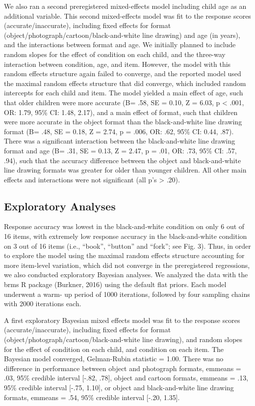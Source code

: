 \documentclass[10pt, letterpaper]{article}
\begin{document}
We also ran a second preregistered mixed-effects model including child
age as an additional variable. This second mixed-effects model was fit
to the response scores (accurate/inaccurate), including fixed effects
for format (object/photograph/cartoon/black-and-white line drawing) and
age (in years), and the interactions between format and age. We
initially planned to include random slopes for the effect of condition
on each child, and the three-way interaction between condition, age, and
item. However, the model with this random effects structure again failed
to converge, and the reported model used the maximal random effects
structure that did converge, which included random intercepts for each
child and item. The model yielded a main effect of age, such that older
children were more accurate (B= .58, SE = 0.10, Z = 6.03, p \textless{}
.001, OR: 1.79, 95\% CI: 1.48, 2.17), and a main effect of format, such
that children were more accurate in the object format than the
black-and-white line drawing format (B= .48, SE = 0.18, Z = 2.74, p =
.006, OR: .62, 95\% CI: 0.44, .87). There was a significant interaction
between the black-and-white line drawing format and age (B= .31, SE =
0.13, Z = 2.47, p = .01, OR: .73, 95\% CI: .57, .94), such that the
accuracy difference between the object and black-and-white line drawing
formats was greater for older than younger children. All other main
effects and interactions were not significant (all p's \textgreater{}
.20).

\subsection{Exploratory Analyses}\label{exploratory-analyses}

Response accuracy was lowest in the black-and-white condition on only 6
out of 16 items, with extremely low response accuracy in the
black-and-white condition on 3 out of 16 items (i.e., ``book'',
``button'' and ``fork''; see Fig. 3). Thus, in order to explore the
model using the maximal random effects structure accounting for more
item-level variation, which did not converge in the preregistered
regressions, we also conducted exploratory Bayesian analyses. We
analyzed the data with the brms R package (Burkner, 2016) using the
default flat priors. Each model underwent a warm- up period of 1000
iterations, followed by four sampling chains with 2000 iterations each.

A first exploratory Bayesian mixed effects model was fit to the response
scores (accurate/inaccurate), including fixed effects for format
(object/photograph/cartoon/black-and-white line drawing), and random
slopes for the effect of condition on each child, and condition on each
item. The Bayesian model converged, Gelman-Rubin statistic = 1.00. There
was no difference in performance between object and photograph formats,
emmeans = .03, 95\% credible interval {[}-.82, .78{]}, object and
cartoon formats, emmeans = .13, 95\% credible interval {[}-.75, 1.10{]},
or object and black-and-white line drawing formats, emmeans = .54, 95\%
credible interval {[}-.20, 1.35{]}.
\end{document}
